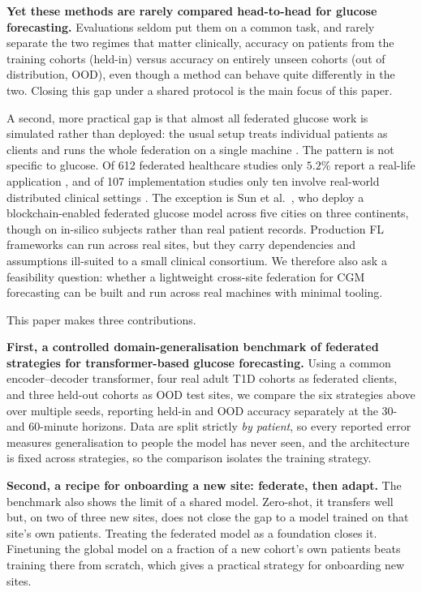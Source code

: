 \documentclass[10pt,letterpaper]{article}
\begin{document}
\textbf{Yet these methods are rarely compared head-to-head for glucose
forecasting.} Evaluations seldom put them on a common task, and rarely
separate the two regimes that matter clinically, accuracy on patients from
the training cohorts (held-in) versus accuracy on entirely unseen cohorts
(out of distribution, OOD), even though a method can behave quite
differently in the two. Closing this gap under a shared protocol is the
main focus of this paper.

A second, more practical gap is that almost all federated glucose work is
simulated rather than deployed: the usual setup treats individual patients
as clients and runs the whole federation on a single machine
\cite{piao2023graph,piao2026gluadfl,darpit2025fedglu,defalco2023federated}.
The pattern is not specific to glucose. Of 612 federated healthcare
studies only $5.2\%$ report a real-life application \cite{teo2024federated},
and of 107 implementation studies only ten involve real-world distributed
clinical settings \cite{li2025challenges}. The exception is Sun et al.\
\cite{sun2025multicontinental}, who deploy a blockchain-enabled federated
glucose model across five cities on three continents, though on in-silico
subjects rather than real patient records. Production FL frameworks can run
across real sites, but they carry dependencies and assumptions ill-suited
to a small clinical consortium. We therefore also ask a feasibility
question: whether a lightweight cross-site federation for CGM forecasting
can be built and run across real machines with minimal tooling.

This paper makes three contributions.

\textbf{First, a controlled domain-generalisation benchmark of federated
strategies for transformer-based glucose forecasting.} Using a common
encoder--decoder transformer, four real adult T1D cohorts as federated
clients, and three held-out cohorts as OOD test sites, we compare the six
strategies above over multiple seeds, reporting held-in and OOD accuracy
separately at the 30- and 60-minute horizons. Data are split strictly
\emph{by patient}, so every reported error measures generalisation to
people the model has never seen, and the architecture is fixed across
strategies, so the comparison isolates the training strategy.

\textbf{Second, a recipe for onboarding a new site: federate, then adapt.} The
benchmark also shows the limit of a shared model. Zero-shot, it transfers
well but, on two of three new sites, does not close the gap to a model
trained on that site's own patients. Treating the federated model as a foundation closes it. Finetuning
the global model on a fraction of a new cohort's own patients beats training
there from scratch, which gives a practical strategy for onboarding new
sites.
\end{document}
